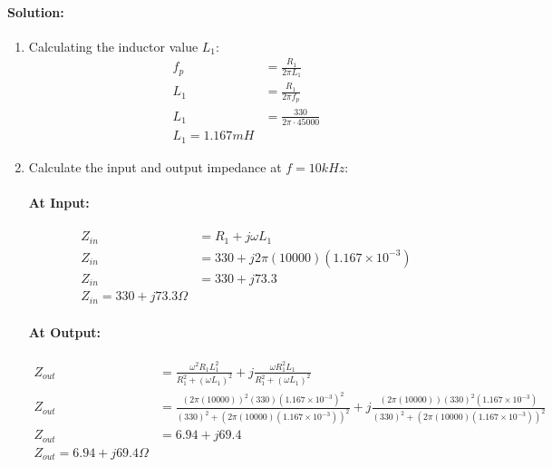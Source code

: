 \paragraph{Solution:}
\begin{enumerate}
  \item Calculating the inductor value \(L_1\):
    \begin{align*}
      f_p &= \frac{R_1}{2 \pi L_1} \\
      L_1 &= \frac{R_1}{2 \pi f_p} \\
      L_1 &= \frac{330}{2 \pi \cdot 45000} \\
      L_1 = 1.167 mH
    \end{align*}
  \item Calculate the input and output impedance at
    \(f = 10kHz\):
    \paragraph{At Input:}
      \begin{align*}
        Z_{in} &= R_1 + j \omega L_1 \\
        Z_{in} &= 330 + j 2 \pi (10000) (1.167 \times 10^{-3}) \\
        Z_{in} &= 330 + j 73.3 \\
        Z_{in} = 330 + j 73.3 \Omega
      \end{align*}
    \paragraph{At Output:}
      \begin{align*}
        Z_{out} &= \frac{\omega^2 R_1 L_1^2}{R_1^2 + (\omega L_1)^2} + j \frac{\omega R_1^2 L_1}{R_1^2 + (\omega L_1)^2} \\
        Z_{out} &= \frac{(2 \pi (10000))^2 (330) (1.167 \times 10^{-3})^2}{(330)^2 + (2 \pi (10000) (1.167 \times 10^{-3}))^2} + j \frac{(2 \pi (10000)) (330)^2 (1.167 \times 10^{-3})}{(330)^2 + (2 \pi (10000) (1.167 \times 10^{-3}))^2} \\
        Z_{out} &= 6.94 + j 69.4 \\
        Z_{out} = 6.94 + j 69.4 \Omega
      \end{align*}
\end{enumerate}

